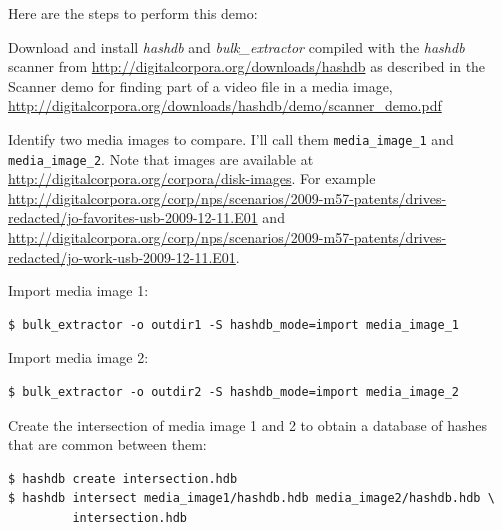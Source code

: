 \documentclass[12pt,twoside]{article}
\newcommand{\hdb}{\emph{hashdb}\xspace}
\newcommand{\bulk}{\emph{bulk\_extractor}\xspace}
\begin{document}
Here are the steps to perform this demo:
\begin{compactenum}
\item Download and install \hdb  and \bulk compiled with the \hdb scanner
from
\url{http://digitalcorpora.org/downloads/hashdb}
as described in the Scanner demo
for finding part of a video file in a media image,
\url{http://digitalcorpora.org/downloads/hashdb/demo/scanner\_demo.pdf}
\item Identify two media images to compare.
I'll call them \texttt{media\_image\_1} and \texttt{media\_image\_2}.
Note that images are available at
\url{http://digitalcorpora.org/corpora/disk-images}.
For example
\url{http://digitalcorpora.org/corp/nps/scenarios/2009-m57-patents/drives-redacted/jo-favorites-usb-2009-12-11.E01}
and
\url{http://digitalcorpora.org/corp/nps/scenarios/2009-m57-patents/drives-redacted/jo-work-usb-2009-12-11.E01}.

\item Import media image 1:
\begin{verbatim}
$ bulk_extractor -o outdir1 -S hashdb_mode=import media_image_1
\end{verbatim}

\item Import media image 2:
\begin{verbatim}
$ bulk_extractor -o outdir2 -S hashdb_mode=import media_image_2
\end{verbatim}

\item Create the intersection of media image 1 and 2
to obtain a database of hashes that are common between them:
\begin{verbatim}
$ hashdb create intersection.hdb
$ hashdb intersect media_image1/hashdb.hdb media_image2/hashdb.hdb \
         intersection.hdb
\end{verbatim}
\end{compactenum}
\end{document}
